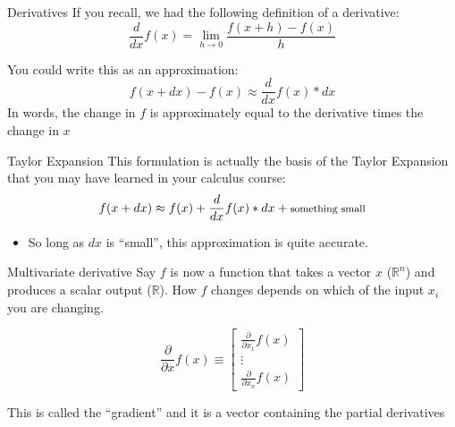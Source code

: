 \documentclass[aspectratio=169,t,11pt,table]{beamer}
\begin{document}
\begin{frame}{Derivatives}
  If you recall, we had the following definition of a derivative:
  $$
    \frac{d}{dx} f(x) = \lim_{h \to 0} \frac{f(x + h) - f(x)}{h}
  $$

  \bigskip
  You could write this as an approximation:
  $$
    f(x + dx) - f(x) \approx \frac{d}{dx} f(x) * dx
  $$
  In words, the change in $f$ is approximately equal to  the derivative times the change in $x$
\end{frame}


\begin{frame}{Taylor Expansion}
  This formulation is actually the basis of the Taylor Expansion that you may have learned in your calculus course:
  $$
    f(x + dx) \approx f(x) + \frac{d}{dx} f(x) * dx + \text{\footnotesize something small}
  $$  
  
  \begin{itemize}
    \item So long as $dx$ is ``small'', this approximation is quite accurate.
  \end{itemize}
\end{frame}

\begin{frame}{Multivariate derivative}
  Say $f$ is now a function that takes a vector $x$ ($\mathbb{R}^n$) and produces a scalar output ($\mathbb{R}$). How $f$ changes depends on which of the input $x_i$ you are changing.

  $$
    \frac{\partial}{\partial x}  f(x) \equiv \begin{bmatrix}
      \frac{\partial}{\partial x_1} f(x) \\ \vdots \\ \frac{\partial}{\partial x_n} f(x)
    \end{bmatrix}
  $$

  \bigskip
  This is called the ``gradient'' and it is a vector containing the partial derivatives
\end{frame}
\end{document}

